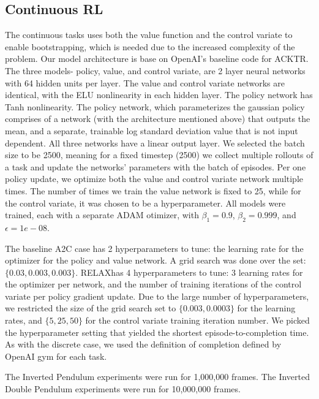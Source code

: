 \documentclass{article}
\newcommand{\RELAX}{{\textnormal{RELAX}}}
\begin{document}
\subsection{Continuous RL}
The continuous tasks uses both the value function and the control variate to enable bootstrapping, which is needed due to the increased complexity of the problem. Our model architecture is base on OpenAI's baseline\cite{?} code for ACKTR\cite{?}. The three models- policy, value, and control variate, are 2 layer neural networks with 64 hidden units per layer. The value and control variate networks are identical, with the ELU nonlinearity in each hidden layer. The policy network has Tanh nonlinearity. The policy network, which parameterizes the gaussian policy comprises of a network (with the architecture mentioned above) that outputs the mean, and a separate, trainable log standard deviation value that is not input dependent. All three networks have a linear output layer. We selected the batch size to be 2500, meaning for a fixed timestep (2500) we collect multiple rollouts of a task and update the networks' parameters with the batch of episodes. Per one policy update, we optimize both the value and control variate network multiple times. The number of times we train  the value network is fixed to 25, while for the control variate, it was chosen to be a hyperparameter. 
All models were trained, each with a separate ADAM \cite{kingma2015adam} otimizer, with $\beta_1=0.9$, $\beta_2=0.999$, and $\epsilon=1e-08$. 

The baseline A2C case has 2 hyperparameters to tune: the learning rate for the optimizer for the policy and value network. A grid search was done over the set: $\{0.03, 0.003, 0.003\}$. \RELAX has 4 hyperparameters to tune: 3 learning rates for the optimizer per network, and the number of training iterations of the control variate per policy gradient update. Due to the large number of hyperparameters, we restricted the size of the grid search set to $\{0.003, 0.0003\}$ for the learning rates, and $\{5, 25, 50\}$ for the control variate training iteration number. We picked the hyperparameter setting that yielded the shortest episode-to-completion time. As with the discrete case, we used the definition of completion defined by OpenAI gym\cite{1606.01540} for each task. 

The Inverted Pendulum experiments were run for 1,000,000 frames. The Inverted Double Pendulum experiments were run for 10,000,000 frames.
\end{document}
